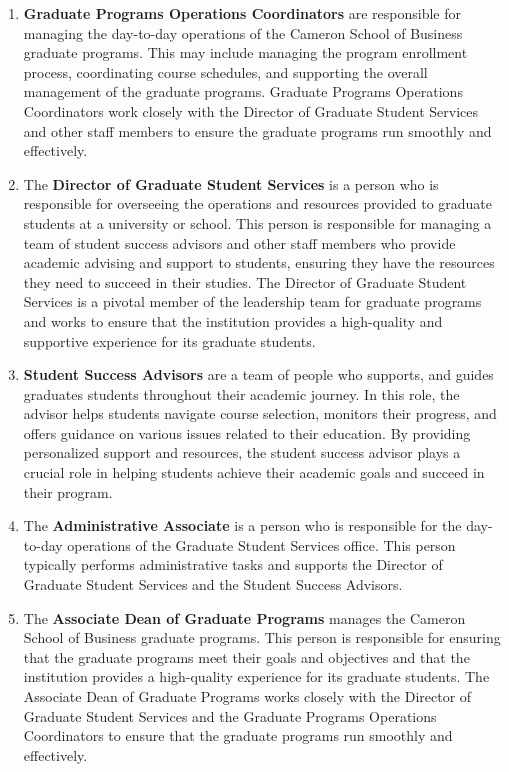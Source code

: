 \documentclass[12pt]{article}
\begin{document}
\begin{enumerate}[label=(\roman*)]
    \item \textbf{Graduate Programs Operations Coordinators} are responsible for managing the day-to-day operations of the Cameron School of Business graduate programs. This may include managing the program enrollment process, coordinating course schedules, and supporting the overall management of the graduate programs. Graduate Programs Operations Coordinators work closely with the Director of Graduate Student Services and other staff members to ensure the graduate programs run smoothly and effectively.
    \item The \textbf{Director of Graduate Student Services} is a person who is responsible for overseeing the operations and resources provided to graduate students at a university or school. This person is responsible for managing a team of student success advisors and other staff members who provide academic advising and support to students, ensuring they have the resources they need to succeed in their studies. The Director of Graduate Student Services is a pivotal member of the leadership team for graduate programs and works to ensure that the institution provides a high-quality and supportive experience for its graduate students.
    \item \textbf{Student Success Advisors} are a team of people who supports, and guides graduates students throughout their academic journey. In this role, the advisor helps students navigate course selection, monitors their progress, and offers guidance on various issues related to their education. By providing personalized support and resources, the student success advisor plays a crucial role in helping students achieve their academic goals and succeed in their program.
    \item The \textbf{Administrative Associate} is a person who is responsible for the day-to-day operations of the Graduate Student Services office. This person typically performs administrative tasks and supports the Director of Graduate Student Services and the Student Success Advisors.
    \item The \textbf{Associate Dean of Graduate Programs} manages the Cameron School of Business graduate programs. This person is responsible for ensuring that the graduate programs meet their goals and objectives and that the institution provides a high-quality experience for its graduate students. The Associate Dean of Graduate Programs works closely with the Director of Graduate Student Services and the Graduate Programs Operations Coordinators to ensure that the graduate programs run smoothly and effectively.
\end{enumerate}
\end{document}
